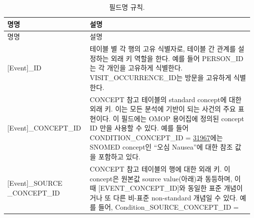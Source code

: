 \documentclass[10.5pt]{book}
\theoremstyle{definition}
\theoremstyle{definition}
\theoremstyle{definition}
\theoremstyle{remark}
\begin{document}
\begin{longtable}[]{@{}ll@{}}
\caption{\label{tab:fieldConventions} 필드명 규칙.}\tabularnewline
\toprule
\begin{minipage}[b]{0.34\columnwidth}\raggedright\strut
명명\strut
\end{minipage} & \begin{minipage}[b]{0.60\columnwidth}\raggedright\strut
설명\strut
\end{minipage}\tabularnewline
\midrule
\endfirsthead
\toprule
\begin{minipage}[b]{0.34\columnwidth}\raggedright\strut
명명\strut
\end{minipage} & \begin{minipage}[b]{0.60\columnwidth}\raggedright\strut
설명\strut
\end{minipage}\tabularnewline
\midrule
\endhead
\begin{minipage}[t]{0.34\columnwidth}\raggedright\strut
{[}Event{]}\_ID\strut
\end{minipage} & \begin{minipage}[t]{0.60\columnwidth}\raggedright\strut
테이블 별 각 행의 고유 식별자로, 테이블 간 관계를 설정하는 외래 키
역할을 한다. 예를 들어 PERSON\_ID는 각 개인을 고유하게 식별한다.
VISIT\_OCCURRENCE\_ID는 방문을 고유하게 식별한다.\strut
\end{minipage}\tabularnewline
\begin{minipage}[t]{0.34\columnwidth}\raggedright\strut
{[}Event{]}\_CONCEPT\_ID\strut
\end{minipage} & \begin{minipage}[t]{0.60\columnwidth}\raggedright\strut
CONCEPT 참고 테이블의 standard concept에 대한 외래 키. 이는 모든 분석에
기반이 되는 사건의 주요 표현이다. 이 필드에는 OMOP 용어집에 정의된
concept ID 만을 사용할 수 있다. 예를 들어 CONDITION\_CONCEPT\_ID =
\href{http://athena.ohdsi.org/search-terms/terms/31967}{31967}에는
SNOMED concept인 ``오심 Nausea''에 대한 참조 값을 포함하고 있다.\strut
\end{minipage}\tabularnewline
\begin{minipage}[t]{0.34\columnwidth}\raggedright\strut
{[}Event{]}\_SOURCE \_CONCEPT\_ID\strut
\end{minipage} & \begin{minipage}[t]{0.60\columnwidth}\raggedright\strut
CONCEPT 참고 테이블의 행에 대한 외래 키. 이 concept은 원본값 source
value(아래)과 동등하며, 이때 {[}EVENT\_CONCEPT\_ID{]}와 동일한 표준
개념이거나 또 다른 비-표준 non-standard 개념일 수 있다. 예를 들어,
Condition\_SOURCE\_CONCEPT\_ID =

\end{minipage}
\end{longtable}
\end{document}
